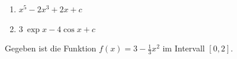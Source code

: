\documentclass[11pt]{exam}
\begin{document}
\begin{questions}
{\begin{solution}
		\begin{enumerate}[label=\roman*)]
			\item $x^5 - 2x^3 + 2x + c$
			\item $3\:\exp{x} - 4\cos{x} + c$
		\end{enumerate}
\end{solution}}
{}



\newpage
\noaddpoints
\question[\totalpoints]
\addpoints
Gegeben ist die Funktion $f(x) = 3 - \frac{1}{3}x^2$ im Intervall $[0,2]$.
\begin{parts}

\end{parts}
\end{questions}
\end{document}
